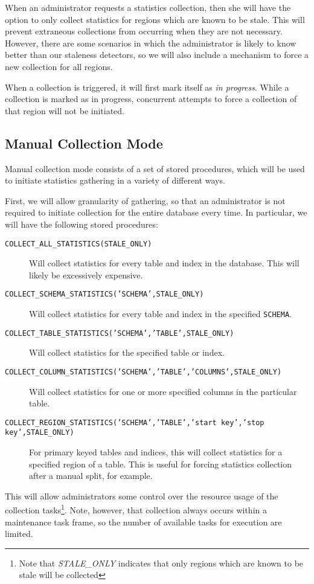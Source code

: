 When an administrator requests a statistics collection, then she will have the option to only collect statistics for regions which are known to be stale. This will prevent extraneous collections from occurring when they are not necessary. However, there are some scenarios in which the administrator is likely to know better than our staleness detectors, so we will also include a mechanism to force a new collection for all regions.

When a collection is triggered, it will first mark itself as \emph{in progress}. While a collection is marked as in progress, concurrent attempts to force a collection of that region will not be initiated.

\subsection{Manual Collection Mode}
Manual collection mode consists of a set of stored procedures, which will be used to initiate statistics gathering in a variety of different ways.

First, we will allow granularity of gathering, so that an administrator is not required to initiate collection for the entire database every time. In particular, we will have the following stored procedures:

\begin{description}
				\item[\texttt{COLLECT\_ALL\_STATISTICS(STALE\_ONLY)}] Will collect statistics for every table and index in the database. This will likely be excessively expensive.
				\item[\texttt{COLLECT\_SCHEMA\_STATISTICS('SCHEMA',STALE\_ONLY)}] Will collect statistics for every table and index in the specified \texttt{SCHEMA}. 
				\item[\texttt{COLLECT\_TABLE\_STATISTICS('SCHEMA','TABLE',STALE\_ONLY)}] Will collect statistics for the specified table or index.
				\item[\texttt{COLLECT\_COLUMN\_STATISTICS('SCHEMA','TABLE','COLUMNS',STALE\_ONLY)}] Will collect statistics for one or more specified columns in the particular table.
				\item[\texttt{COLLECT\_REGION\_STATISTICS('SCHEMA','TABLE','start key','stop key',STALE\_ONLY)}] For primary keyed tables and indices, this will collect statistics for a specified region of a table. This is useful for forcing statistics collection after a manual split, for example.
\end{description}
This will allow administrators some control over the resource usage of the collection tasks\footnote{Note that \emph{STALE\_ONLY} indicates that only regions which are known to be stale will be collected}. Note, however, that collection always occurs within a maintenance task frame, so the number of available tasks for execution are limited. 

